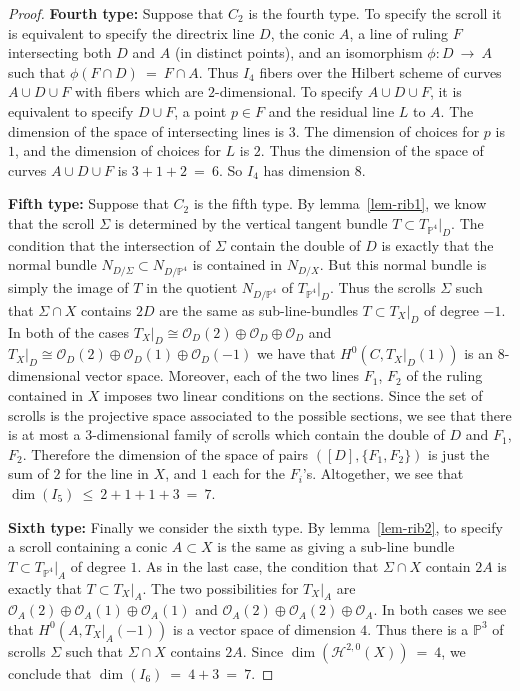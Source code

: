 \documentclass[twoside,12pt,reqno]{amsart}
\theoremstyle{plain}
\theoremstyle{definition}
\newcommand{\Hdg}[2]{\mathcal{H}^{#1,#2}}
\newcommand{\PP}{\mathbb{P}}
\def\ps{\vspace{4pt}}
\newcommand{\OO}{\mathcal O}
\begin{document}
\begin{proof}
\ps

\textbf{Fourth type:}
Suppose that $C_2$ is the fourth type.  To specify the scroll it is
equivalent to specify the directrix line $D$, the conic $A$, a line of
ruling $F$ intersecting both $D$ and $A$ (in distinct
points), and an isomorphism $\phi:D~\rightarrow~ A$ such that
$\phi(F\cap D) ~=~ F\cap A$.  Thus $I_4$ fibers over the Hilbert scheme
of curves $A\cup D\cup F$ with fibers which are $2$-dimensional.  To
specify $A\cup D\cup F$, it is equivalent to specify $D\cup F$, a
point $p\in F$ and the residual line $L$ to $A$.  The dimension of the
space of intersecting lines is $3$.  The dimension of choices for $p$
is $1$,  and the dimension of choices for $L$ is $2$.  Thus the
dimension of the space of curves $A\cup D\cup F$ is $3+1+2~=~6$.  So
$I_4$ has dimension $8$.

\ps

\textbf{Fifth type:}
Suppose that $C_2$ is the fifth type.  By lemma~\ref{lem-rib1}, we
know that the scroll $\Sigma$ is determined by the vertical tangent
bundle $T\subset T_{\PP^4}|_D$.  The condition that the intersection
of $\Sigma$ contain the double of $D$ is exactly that the normal
bundle $N_{D/\Sigma}\subset N_{D/\PP^4}$ is contained in $N_{D/X}$.
But this normal bundle is simply the image of $T$ in the quotient
$N_{D/\PP^4}$ of $T_{\PP^4}|_D$.  Thus the scrolls $\Sigma$ such that
$\Sigma\cap X$ contains $2D$ are the same as sub-line-bundles $T\subset
T_X|_D$ of degree $-1$.  In both of the cases $T_X|_D \cong \OO_D(2)\oplus
\OO_D\oplus \OO_D$ and $T_X|_D\cong \OO_D(2)\oplus
\OO_D(1)\oplus\OO_D(-1)$ we have that $H^0(C,T_X|_D(1))$ is an
$8$-dimensional vector space.  
Moreover, each of the two lines $F_1$, $F_2$ of the ruling contained
in $X$ imposes two
linear conditions on the
sections.  Since the set of scrolls is the projective space associated to
the possible sections, we see that there is at most a $3$-dimensional family 
of scrolls which contain the double of $D$ and $F_1$, $F_2$.  Therefore
the dimension of the
space of pairs $([D],\{F_1,F_2\})$ is just the sum of $2$ for the line in $X$,
and $1$ each for the $F_i$'s.   Altogether,
we see that $\dim (I_5)~\leq~2+1+1+3~=~7$.

\ps

\textbf{Sixth type:}
Finally we consider the sixth type.  By lemma~\ref{lem-rib2}, to
specify a scroll containing a conic $A\subset X$ is the same as giving
a sub-line bundle $T\subset T_{\PP^4}|_A$ of degree $1$.  As in the
last case, the condition that $\Sigma\cap X$ contain $2A$ is exactly
that $T\subset T_X|_A$.  The two possibilities for $T_X|_A$ are
$\OO_A(2)\oplus \OO_A(1)\oplus \OO_A(1)$ and
$\OO_A(2)\oplus\OO_A(2)\oplus\OO_A$.  In both cases we see that
$H^0(A,T_X|_A(-1))$ is a vector space of dimension $4$.  Thus there is
a $\PP^3$ of scrolls $\Sigma$ such that $\Sigma\cap X$ contains $2A$.
Since $\dim (\Hdg{2}{0}(X))~=~4$, we conclude that $\dim (I_6)
~=~ 4+3 ~=~ 7$.


\end{proof}
\end{document}

